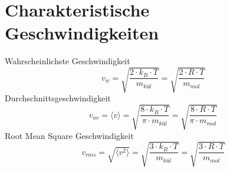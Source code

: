 \section{Charakteristische Geschwindigkeiten}
Wahrscheinlichste Geschwindigkeit
\[ \boxed{v_w = \sqrt{\frac{2 \cdot k_B \cdot T}{m_{kül}}} 
= \sqrt{\frac{2 \cdot R \cdot T}{m_{mol}}}} \]
Durchschnittsgeschwindigkeit
\[ \boxed{v_{av} = \langle v \rangle 
= \sqrt{\frac{8 \cdot k_B \cdot T}{\pi \cdot m_{kül}}} 
= \sqrt{\frac{8 \cdot R \cdot T}{\pi \cdot m_{mol}}}} \]
Root Mean Square Geschwindigkeit
\[ \boxed{v_{rms} = \sqrt{\langle v^2 \rangle} 
= \sqrt{\frac{3 \cdot k_B \cdot T}{m_{kül}}} 
= \sqrt{\frac{3 \cdot R \cdot T}{m_{mol}}}} \]
